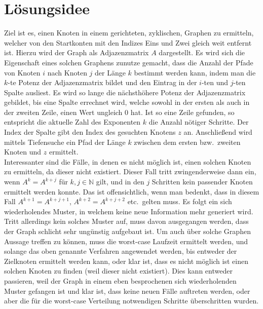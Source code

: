 \maketitle
\tableofcontents

\vspace{0.5cm}


\section{Lösungsidee}\label{sec:losungsidee}
Ziel ist es, einen Knoten in einem gerichteten, zyklischen,
Graphen zu ermitteln, welcher von den Startkonten mit
den Indizes Eins und Zwei gleich weit entfernt ist.
Hierzu wird der Graph als Adjazenzmatrix $A$ dargestellt.
Es wird sich die Eigenschaft eines solchen Graphens zunutze gemacht, dass die Anzahl der Pfade von Knoten $i$
nach Knoten $j$ der Länge $k$ bestimmt werden kann, indem man die $k$-te
Potenz der Adjazenzmatrix bildet und den Eintrag in der $i$-ten und $j$-ten Spalte ausliest.
Es wird so lange die nächsthöhere Potenz der Adjazenzmatrix gebildet, bis eine Spalte errechnet wird, welche sowohl
in der ersten als auch in der zweiten Zeile, einen Wert ungleich 0 hat.
Ist so eine Zeile gefunden, so entspricht die aktuelle Zahl des Exponenten $k$ die Anzahl nötiger Schritte.
Der Index der Spalte gibt den Index des gesuchten Knotens $z$ an.
Anschließend wird mittels Tiefensuche ein Pfad der Länge $k$ zwischen dem ersten bzw.\ zweiten Knoten und $z$ ermittelt. \\
Interessanter sind die Fälle, in denen es nicht möglich ist, einen solchen Knoten zu ermitteln, da dieser nicht existiert.
Dieser Fall tritt zwingenderweise dann ein, wenn $A^k=A^{k + j}$ für $k,j\in\mathbb{N}$ gilt,
und in den $j$ Schritten kein passender Knoten ermittelt werden konnte.
Das ist offensichtlich, wenn man bedenkt, dass in diesem Fall  $A^{k + 1}=A^{k + j +1}$, $A^{k + 2}=A^{k + j + 2}$ etc.\ gelten muss.
Es folgt ein sich wiederholendes Muster, in welchem keine neue Information mehr generiert wird. \\
Tritt allerdings kein solches Muster auf, muss davon ausgegangen werden, dass der Graph schlicht sehr ungünstig aufgebaut ist.
Um auch über solche Graphen Aussage treffen zu können, muss die worst-case Laufzeit ermittelt werden, und solange das
oben genannte Verfahren angewendet werden, bis entweder der Zielknoten ermittelt werden kann, oder klar ist,
dass es nicht möglich ist einen solchen Knoten zu finden (weil dieser nicht existiert).
Dies kann entweder passieren, weil der Graph in einem eben besprochenen sich wiederholenden Muster gefangen ist und klar ist,
dass keine neuen Fälle auftreten werden, oder aber die für die worst-case Verteilung notwendigen Schritte überschritten wurden.


